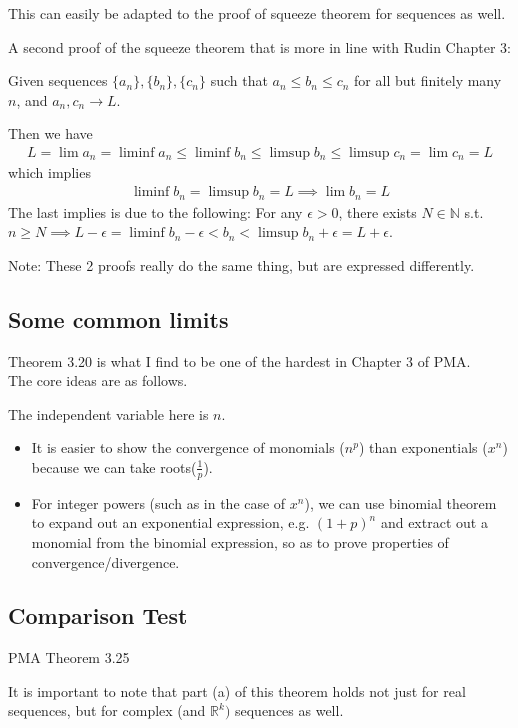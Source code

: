 \documentclass{article}
\begin{document}
This can easily be adapted to the proof of squeeze theorem for sequences as well.

A second proof of the squeeze theorem that is more in line with Rudin Chapter 3:

Given sequences $\{a_n\}, \{b_n\}, \{c_n\}$ such that $a_n\leq b_n\leq c_n$ for all but finitely many $n$, and $a_n, c_n\rightarrow L$.

Then we have \begin{align*}
	L = \lim a_n = \liminf a_n \leq \liminf b_n \leq \limsup b_n \leq \limsup c_n = \lim c_n = L
\end{align*}
which implies
\begin{align*}
	\liminf b_n = \limsup b_n = L \implies \lim b_n = L
\end{align*}
The last implies is due to the following: For any $\epsilon > 0$, there exists $N \in \mathbb{N}$ s.t. $n\geq N\implies L - \epsilon = \liminf b_n - \epsilon < b_n < \limsup b_n + \epsilon = L + \epsilon$.


Note: These 2 proofs really do the same thing, but are expressed differently.


\subsection{Some common limits}
Theorem 3.20 is what I find to be one of the hardest in Chapter 3 of PMA.\\
The core ideas are as follows.

The independent variable here is $n$.
\begin{itemize}
	\item It is easier to show the convergence of monomials ($n^p$) than exponentials ($x^n$) because we can take roots($\frac{1}{p}$).
	\item For integer powers (such as in the case of $x^n$), we can use binomial theorem to expand out an exponential expression, e.g. $(1+p)^n$ and extract out a monomial from the binomial expression, so as to prove properties of convergence/divergence.
\end{itemize}

\subsection{Comparison Test}
PMA Theorem 3.25

It is important to note that part (a) of this theorem holds not just for real sequences, but for complex (and $\mathbb{R}^k)$ sequences as well.
\end{document}
